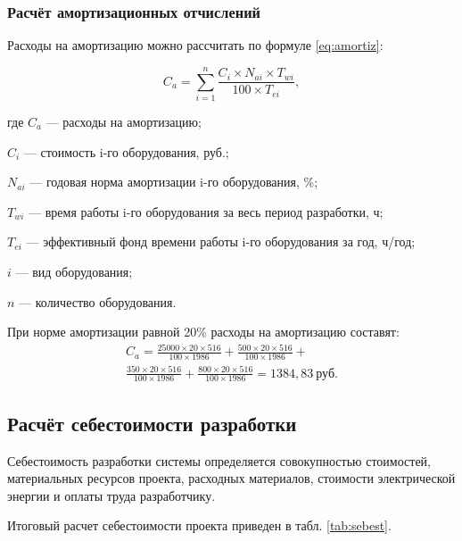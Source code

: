 \subsubsection{Расчёт амортизационных отчислений}

Расходы на амортизацию можно рассчитать по формуле \ref{eq:amortiz}:

\begin{equation}
	\label{eq:amortiz}
	C_{a} = \sum^{n}_{i=1} \frac{C_i \times N_{ai} \times T_{wi}}{100 \times T_{ei}},
\end{equation}
\begin{ESKDexplanation}
	\item где $C_{a}$ --- расходы на амортизацию;
	\item $C_i$ --- стоимость i-го оборудования, руб.;
	\item $N_{ai}$ --- годовая норма амортизации i-го оборудования, \%;
	\item $T_{wi}$ --- время работы i-го оборудования за весь период разработки, ч;
	\item $T_{ei}$ --- эффективный фонд времени работы i-го оборудования за год, ч/год;
	\item $i$ --- вид оборудования;
	\item $n$ --- количество оборудования.
\end{ESKDexplanation}

При норме амортизации равной 20\% расходы на амортизацию составят:
\begin{equation*}
\begin{split}
	C_{a} = 
	\frac{25000 \times 20 \times 516}{100 \times 1986} + 
	\frac{500 \times 20 \times 516}{100 \times 1986} + \\
	\frac{350 \times 20 \times 516}{100 \times 1986} + 
	\frac{800 \times 20 \times 516}{100 \times 1986} =
	1384,83~\text{руб}.
\end{split}
\end{equation*}

\subsection{Расчёт себестоимости разработки}

Себестоимость разработки системы определяется совокупностью стоимостей, материальных ресурсов проекта, расходных материалов, стоимости электрической энергии и оплаты труда разработчику.

Итоговый расчет себестоимости проекта приведен в табл. \ref{tab:sebest}.

